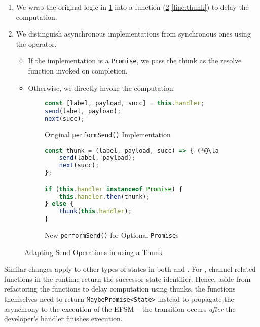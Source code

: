 \begin{enumerate}
\item
We wrap the original logic in \cref{subfig:originalthunk} into a
function (\cref{subfig:newthunk} \cref{line:thunk})
to delay the computation.

\item
We distinguish asynchronous implementations
from synchronous ones using the  operator.

\begin{itemize}
\item
If the implementation is a \texttt{Promise}, we pass
the thunk as the resolve function invoked on completion.

\item
Otherwise, we directly invoke the computation.
\end{itemize}

\end{enumerate}

\begin{figure}[!h]
\begin{subfigure}{\textwidth}
\begin{lstlisting}[language=javascript,tabsize=2]
const [label, payload, succ] = this.handler;
send(label, payload);
next(succ);
\end{lstlisting}
\caption{Original \texttt{performSend()} Implementation}
\label{subfig:originalthunk}
\end{subfigure}
\hfill
\begin{subfigure}{\textwidth}
\begin{lstlisting}[language=javascript,tabsize=2]
const thunk = (label, payload, succ) => { (*@\label{line:thunk}@*)
	send(label, payload);
	next(succ);	
};

if (this.handler instanceof Promise) {
	this.handler.then(thunk);
} else {
	thunk(this.handler);
}
\end{lstlisting}
\caption{New \texttt{performSend()} for Optional \texttt{Promise}s}
\label{subfig:newthunk}
\end{subfigure}
\caption{Adapting Send Operations in 
using a Thunk}
\label{fig:thunk}
\end{figure}

Similar changes apply to other types of states in both
 and .
For , channel-related functions in the runtime
return the successor state identifier. Hence, aside from
refactoring the functions to delay computation using thunks,
the functions themselves need to
return \texttt{MaybePromise<State>} instead
to propagate the asynchrony
to the execution of the EFSM -- the transition occurs
\textit{after} the developer's handler finishes execution.

